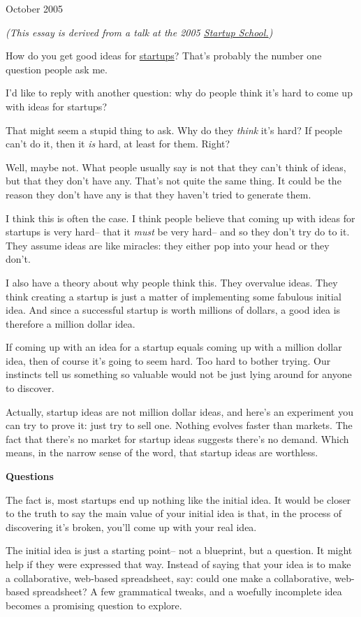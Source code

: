 October 2005

\emph{(This essay is derived from a talk at the 2005
\href{http://startupschool.org}{Startup School.})}

How do you get good ideas for \href{start.html}{startups}? That's
probably the number one question people ask me.

I'd like to reply with another question: why do people think it's hard
to come up with ideas for startups?

That might seem a stupid thing to ask. Why do they \emph{think} it's
hard? If people can't do it, then it \emph{is} hard, at least for them.
Right?

Well, maybe not. What people usually say is not that they can't think of
ideas, but that they don't have any. That's not quite the same thing. It
could be the reason they don't have any is that they haven't tried to
generate them.

I think this is often the case. I think people believe that coming up
with ideas for startups is very hard-- that it \emph{must} be very
hard-- and so they don't try do to it. They assume ideas are like
miracles: they either pop into your head or they don't.

I also have a theory about why people think this. They overvalue ideas.
They think creating a startup is just a matter of implementing some
fabulous initial idea. And since a successful startup is worth millions
of dollars, a good idea is therefore a million dollar idea.

If coming up with an idea for a startup equals coming up with a million
dollar idea, then of course it's going to seem hard. Too hard to bother
trying. Our instincts tell us something so valuable would not be just
lying around for anyone to discover.

Actually, startup ideas are not million dollar ideas, and here's an
experiment you can try to prove it: just try to sell one. Nothing
evolves faster than markets. The fact that there's no market for startup
ideas suggests there's no demand. Which means, in the narrow sense of
the word, that startup ideas are worthless.

\textbf{Questions}

The fact is, most startups end up nothing like the initial idea. It
would be closer to the truth to say the main value of your initial idea
is that, in the process of discovering it's broken, you'll come up with
your real idea.

The initial idea is just a starting point-- not a blueprint, but a
question. It might help if they were expressed that way. Instead of
saying that your idea is to make a collaborative, web-based spreadsheet,
say: could one make a collaborative, web-based spreadsheet? A few
grammatical tweaks, and a woefully incomplete idea becomes a promising
question to explore.

